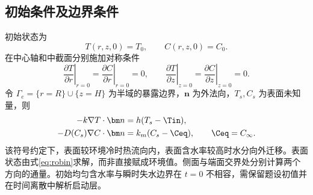 \subsection{初始条件及边界条件}
初始状态为
\begin{equation}
 T(r,z,0)=T_0,\qquad C(r,z,0)=C_0.
 \label{eq:initial}
\end{equation}
在中心轴和中截面分别施加对称条件
\begin{equation}
 \left.\frac{\partial T}{\partial r}\right|_{r=0}
 =\left.\frac{\partial C}{\partial r}\right|_{r=0}=0,\qquad
 \left.\frac{\partial T}{\partial z}\right|_{z=0}
 =\left.\frac{\partial C}{\partial z}\right|_{z=0}=0.
 \label{eq:symmetry}
\end{equation}
令 $\Gamma_e=\{r=R\}\cup\{z=H\}$ 为半域的暴露边界，$\bm n$ 为外法向，$T_s,C_s$ 为表面未知量，则
\begin{equation}
 \begin{aligned}
 -k\nabla T\cdot\bm n&=h(T_s-\Tin),\\
 -D(C_s)\nabla C\cdot\bm n&=k_m(C_s-\Ceq),\qquad \Ceq=C_\infty.
 \end{aligned}
 \label{eq:robin}
\end{equation}
该符号约定下，表面较环境冷时热流向内，表面含水率较高时水分向外迁移。表面状态由式\eqref{eq:robin}求解，而非直接赋成环境值。侧面与端面交界处分别计算两个方向的通量。初始均匀含水率与瞬时失水边界在 $t=0$ 不相容，需保留题设初值并在时间离散中解析启动层。
